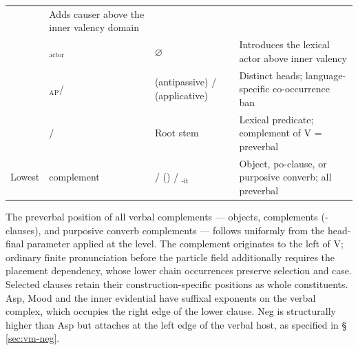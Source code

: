 \begin{table}[ht]
\begin{tabularx}{\textwidth}{l l l L}
    & Adds causer above the inner valency domain \\
    & $_{\mathrm{actor}}$ & $\varnothing$
    & Introduces the lexical actor above inner valency \\
    & $_{\mathrm{AP}}$/ &  (antipassive) /  (applicative)
    & Distinct heads; language-specific co-occurrence ban \\
    & / & Root stem
    & Lexical predicate; complement of V = preverbal \\
    Lowest &  complement &  /  () / $_{\text{-it}}$
    & Object, po-clause, or purposive converb; all preverbal \\
    \bottomrule
  \end{tabularx}
\end{table}

\noindent The preverbal position of all verbal complements --- 
objects,  complements (-clauses), and purposive converb
complements --- follows uniformly from the head-final parameter applied at the
 level. The complement originates to the left of V; ordinary finite pronunciation
before the particle field additionally requires the placement dependency,
whose lower chain occurrences preserve selection and case. Selected clauses
retain their construction-specific positions as whole constituents.
Asp, Mood and the inner evidential have suffixal exponents on the verbal
complex, which occupies the right edge of the lower clause. Neg is structurally
higher than Asp but attaches at the left edge of the verbal host, as specified
in §\,\ref{sec:vm-neg}.

